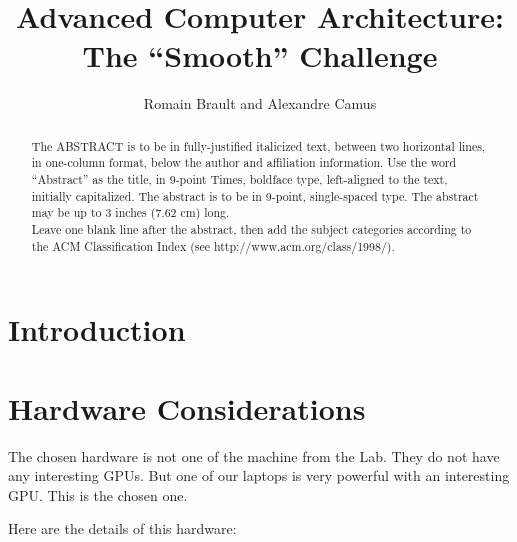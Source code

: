 \documentclass{egpubl}
\title[ACA: The ``Smooth'' Challenge]{Advanced Computer Architecture: The ``Smooth'' Challenge}
\author[R. Brault \& A. Camus]{Romain Brault and Alexandre Camus}
\begin{document}

\maketitle

\begin{abstract}
   The ABSTRACT is to be in fully-justified italicized text, 
   between two horizontal lines,
   in one-column format, 
   below the author and affiliation information. 
   Use the word ``Abstract'' as the title, in 9-point Times, boldface type, 
   left-aligned to the text, initially capitalized. 
   The abstract is to be in 9-point, single-spaced type.
   The abstract may be up to 3 inches (7.62 cm) long. \\
   Leave one blank line after the abstract, 
   then add the subject categories according to the ACM Classification Index 
   (see http://www.acm.org/class/1998/).

\begin{classification} %
\end{classification}

\end{abstract}





\section{Introduction}


\section{Hardware Considerations}

The chosen hardware is not one of the machine from the Lab. They do not have any interesting GPUs. But one of our laptops is very powerful with an interesting GPU. This is the chosen one.

Here are the details of this hardware:


\end{document}
